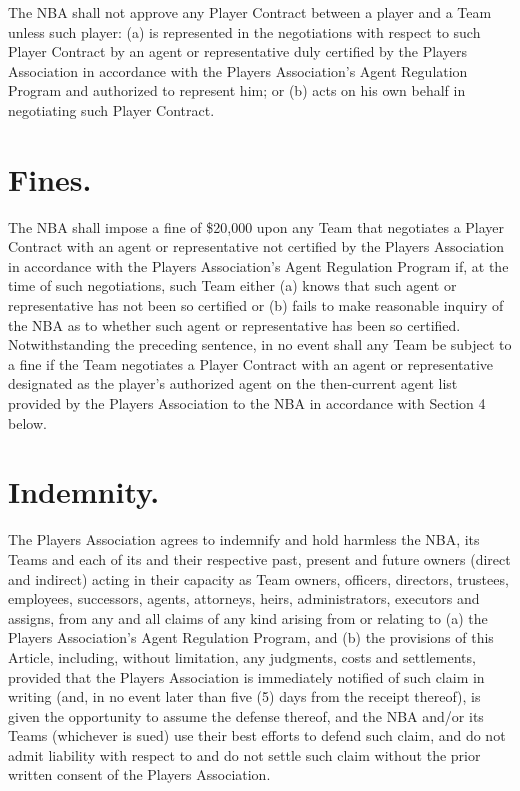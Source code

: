 \documentclass[
]{book}
\begin{document}
The NBA shall not approve any Player Contract between a player and a Team unless such player: (a) is represented in the negotiations with respect to such Player Contract by an agent or representative duly certified by the Players Association in accordance with the Players Association's Agent Regulation Program and authorized to represent him; or (b) acts on his own behalf in negotiating such Player Contract.

\hypertarget{fines.}{%
\section{Fines.}\label{fines.}}

The NBA shall impose a fine of \$20,000 upon any Team that negotiates a Player Contract with an agent or representative not certified by the Players Association in accordance with the Players Association's Agent Regulation Program if, at the time of such negotiations, such Team either (a) knows that such agent or representative has not been so certified or (b) fails to make reasonable inquiry of the NBA as to whether such agent or representative has been so certified. Notwithstanding the preceding sentence, in no event shall any Team be subject to a fine if the Team negotiates a Player Contract with an agent or representative designated as the player's authorized agent on the then-current agent list provided by the Players Association to the NBA in accordance with Section 4 below.

\hypertarget{indemnity.}{%
\section{Indemnity.}\label{indemnity.}}

The Players Association agrees to indemnify and hold harmless the NBA, its Teams and each of its and their respective past, present and future owners (direct and indirect) acting in their capacity as Team owners, officers, directors, trustees, employees, successors, agents, attorneys, heirs, administrators, executors and assigns, from any and all claims of any kind arising from or relating to (a) the Players Association's Agent Regulation Program, and (b) the provisions of this Article, including, without limitation, any judgments, costs and settlements, provided that the Players Association is immediately notified of such claim in writing (and, in no event later than five (5) days from the receipt thereof), is given the opportunity to assume the defense thereof, and the NBA and/or its Teams (whichever is sued) use their best efforts to defend such claim, and do not admit liability with respect to and do not settle such claim without the prior written consent of the Players Association.
\end{document}

